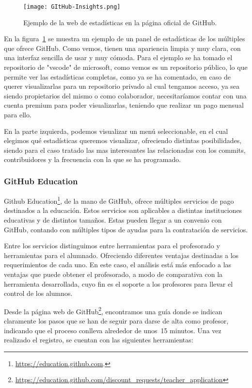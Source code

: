 \begin{figure}[h!]
  \texttt{[image: GItHub-Insights.png]}
  \caption{Ejemplo de la web de estadísticas en la página oficial de
    GitHub.}
  \label{figure:GithubInsights}
\end{figure}

En la figura~\ref{figure:GithubInsights} se muestra un ejemplo de un panel
de estadísticas de los múltiples que ofrece GitHub. Como vemos, tienen una
apariencia limpia y muy clara, con una interfaz sencilla de usar y muy
cómoda. Para el ejemplo se ha tomado el repositorio de "vscode" de
microsoft, como vemos es un repositorio público, lo que permite ver las
estadísticas completas, como ya se ha comentado, en caso de querer
visualizarlas para un repositorio privado al cual tengamos acceso, ya sea
siendo propietarios del mismo o como colaborador, necesitaríamos contar con
una cuenta premium para poder visualizarlas, teniendo que realizar un pago
mensual para ello.

En la parte izquierda, podemos visualizar un menú seleccionable, en el cual
elegimos qué estadísticas queremos visualizar, ofreciendo distintas
posibilidades, siendo para el caso tratado las mas interesantes las
relacionadas con los commits, contribuidores y la frecuencia con la que se
ha programado.

\subsubsection{GitHub Education}

Github Education\footnote{\url{https://education.github.com}.}, de la mano
de GitHub, ofrece múltiples servicios de pago destinados a la
educación. Estos servicios son aplicables a distintas instituciones
educativas y de distintos tamaños. Estas pueden llegar a un convenio con
GitHub, contando con múltiples tipos de ayudas para la contratación de
servicios.

Entre los servicios distinguimos entre herramientas para el profesorado y
herramientas para el alumnado. Ofreciendo diferentes ventajas destinadas a
los requerimientos de cada uno. En este caso, el análisis está más enfocado
a las ventajas que puede obtener el profesorado, a modo de comparativa con
la herramienta desarrollada, cuyo fin es el soporte a los profesores para
llevar el control de los alumnos.

Desde la página web de GitHub\footnote{\url{https://education.github.com/discount_requests/teacher_application}},
encontramos una guía donde se indican claramente los pasos que se han de
seguir para darse de alta como profesor, indicando que el proceso conlleva
alrededor de unos~15 minutos. Una vez realizado el registro, se cuentan con
las siguientes herramientas:

